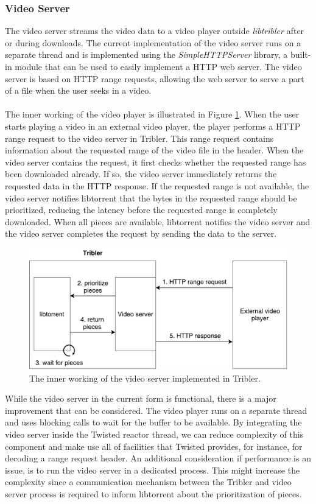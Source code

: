 \subsubsection{\textbf{Video Server}}
\label{subsubsec:video-server}
The video server streams the video data to a video player outside \emph{libtribler} after or during downloads. The current implementation of the video server runs on a separate thread and is implemented using the \emph{SimpleHTTPServer} library, a built-in module that can be used to easily implement a HTTP web server. The video server is based on HTTP range requests, allowing the web server to serve a part of a file when the user seeks in a video.\\\\
The inner working of the video player is illustrated in Figure \ref{fig:video-server}. When the user starts playing a video in an external video player, the player performs a HTTP range request to the video server in Tribler. This range request contains information about the requested range of the video file in the header. When the video server contains the request, it first checks whether the requested range has been downloaded already. If so, the video server immediately returns the requested data in the HTTP response. If the requested range is not available, the video server notifies libtorrent that the  bytes in the requested range should be prioritized, reducing the latency before the requested range is completely downloaded. When all pieces are available, libtorrent notifies the video server and the video server completes the request by sending the data to the server.\\

\begin{figure}[h!]
	\centering
	\includegraphics[width=0.7\columnwidth]{images/architecture/video_server}
	\caption{The inner working of the video server implemented in Tribler.}
	\label{fig:video-server}
\end{figure}

While the video server in the current form is functional, there is a major improvement that can be considered. The video player runs on a separate thread and uses blocking calls to wait for the buffer to be available. By integrating the video server inside the Twisted reactor thread, we can reduce complexity of this component and make use all of facilities that Twisted provides, for instance, for decoding a range request header. An additional consideration if performance is an issue, is to run the video server in a dedicated process. This might increase the complexity since a communication mechanism between the Tribler and video server process is required to inform libtorrent about the prioritization of pieces.

